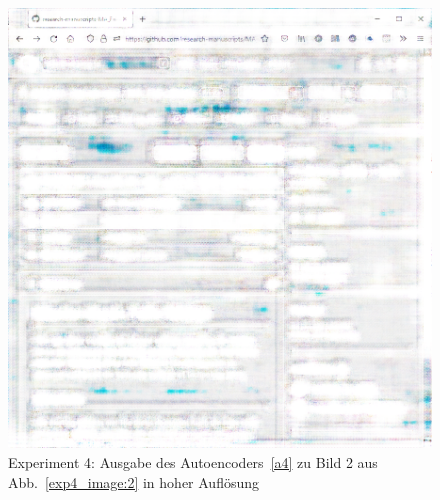\begin{figure} [ht]
  \centering
  \includegraphics[width=\textwidth]{bilder/result_exp4/4_pred_a4.png}

  \caption{Experiment 4: Ausgabe des Autoencoders~\ref{a4} zu Bild 2 aus Abb.~\ref{exp4_image:2} in hoher Auflösung}
\end{figure}

\setcounter{figure}{0}




